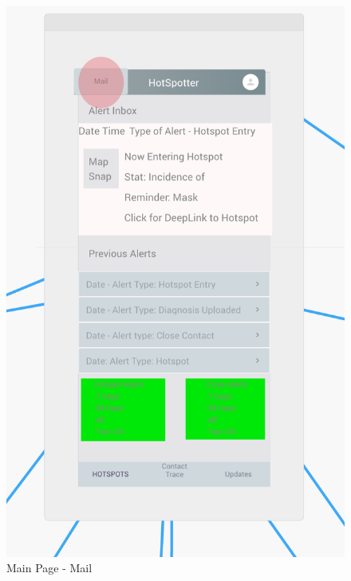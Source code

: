 \documentclass{scrreprt}
\begin{document}
\begin{figure}[H]
	\centering
	\includegraphics[page=1, width=0.9\linewidth]{COMP30830-Mail}
	\caption{Main Page - Mail}
	\label{Mail}
\end{figure}
\end{document}
